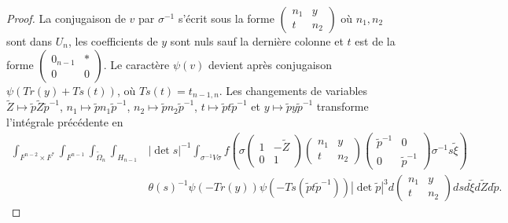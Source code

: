 \documentclass{amsart}
\begin{document}
\begin{proof}
La conjugaison de $v$ par $\sigma^{-1}$ s'écrit sous la forme $\begin{pmatrix}
n_1 & y \\
t & n_2
\end{pmatrix}$ où $n_1, n_2$ sont dans $U_n$, les coefficients de $y$ sont nuls sauf la dernière colonne et $t$ est de la forme $\begin{pmatrix}
0_{n-1} & * \\
0 & 0
\end{pmatrix}$. Le caractère $\psi(v)$ devient après conjugaison $\psi(Tr(y)+Ts(t))$, où $Ts(t) = t_{n-1,n}$. Les changements de variables $\widetilde{Z} \mapsto \widetilde{p}\widetilde{Z}\widetilde{p}^{-1}$, $n_1 \mapsto \widetilde{p}n_1\widetilde{p}^{-1}$, $n_2 \mapsto \widetilde{p}n_2\widetilde{p}^{-1}$,
$t \mapsto \widetilde{p}t\widetilde{p}^{-1}$ et $y \mapsto \widetilde{p}y\widetilde{p}^{-1}$ transforme l'intégrale précédente en
\begin{equation}
\begin{split}
\int_{F^{n-2} \times F^*} \int_{F^{n-1}} \int_{\widetilde{\Omega}_n} \int_{H_{n-1}} & |\det s|^{-1}\int_{\sigma^{-1}V\sigma} f\left(\sigma \begin{pmatrix}
1 & -\widetilde{Z} \\
0 & 1
\end{pmatrix}  \begin{pmatrix}
n_1 & y \\
t & n_2
\end{pmatrix} \begin{pmatrix}
\widetilde{p}^{-1} & 0 \\
0 & \widetilde{p}^{-1}
\end{pmatrix} \sigma^{-1} s \widetilde{\xi}\right) \\
& \theta(s)^{-1} \psi(-Tr(y)) \psi(-Ts(\widetilde{p}t\widetilde{p}^{-1}))|\det \widetilde{p}|^3  d\begin{pmatrix}
n_1 & y \\
t & n_2
\end{pmatrix} ds d\widetilde{\xi} d\widetilde{Z} d\widetilde{p}.
\end{split}
\end{equation}


\end{proof}
\end{document}
